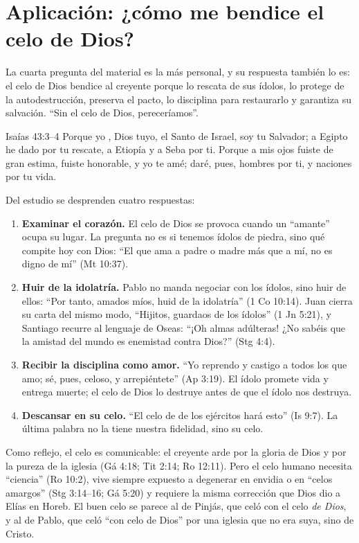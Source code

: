 \section{Aplicación: ¿cómo me bendice el celo de Dios?}

La cuarta pregunta del material es la más personal, y su respuesta también lo es: el celo de Dios bendice al creyente porque lo rescata de sus ídolos, lo protege de la autodestrucción, preserva el pacto, lo disciplina para restaurarlo y garantiza su salvación. ``Sin el celo de Dios, pereceríamos''.

\begin{verso}{Isaías 43:3–4}
Porque yo \SENOR, Dios tuyo, el Santo de Israel, soy tu Salvador; a Egipto he dado por tu rescate, a Etiopía y a Seba por ti. Porque a mis ojos fuiste de gran estima, fuiste honorable, y yo te amé; daré, pues, hombres por ti, y naciones por tu vida.
\end{verso}

Del estudio se desprenden cuatro respuestas:

\begin{enumerate}
\item \textbf{Examinar el corazón.} El celo de Dios se provoca cuando un ``amante'' ocupa su lugar. La pregunta no es si tenemos ídolos de piedra, sino qué compite hoy con Dios: ``El que ama a padre o madre más que a mí, no es digno de mí'' (Mt 10:37).
\item \textbf{Huir de la idolatría.} Pablo no manda negociar con los ídolos, sino huir de ellos: ``Por tanto, amados míos, huid de la idolatría'' (1 Co 10:14). Juan cierra su carta del mismo modo, ``Hijitos, guardaos de los ídolos'' (1 Jn 5:21), y Santiago recurre al lenguaje de Oseas: ``¡Oh almas adúlteras! ¿No sabéis que la amistad del mundo es enemistad contra Dios?'' (Stg 4:4).
\item \textbf{Recibir la disciplina como amor.} ``Yo reprendo y castigo a todos los que amo; sé, pues, celoso, y arrepiéntete'' (Ap 3:19). El ídolo promete vida y entrega muerte; el celo de Dios lo destruye antes de que el ídolo nos destruya.
\item \textbf{Descansar en su celo.} ``El celo de \SENOR{} de los ejércitos hará esto'' (Is 9:7). La última palabra no la tiene nuestra fidelidad, sino su celo.
\end{enumerate}

Como reflejo, el celo es comunicable: el creyente arde por la gloria de Dios y por la pureza de la iglesia (Gá 4:18; Tit 2:14; Ro 12:11). Pero el celo humano necesita ``ciencia'' (Ro 10:2), vive siempre expuesto a degenerar en envidia o en ``celos amargos'' (Stg 3:14--16; Gá 5:20) y requiere la misma corrección que Dios dio a Elías en Horeb. El buen celo se parece al de Pinjás, que celó con el celo \emph{de Dios}, y al de Pablo, que celó ``con celo de Dios'' por una iglesia que no era suya, sino de Cristo.

